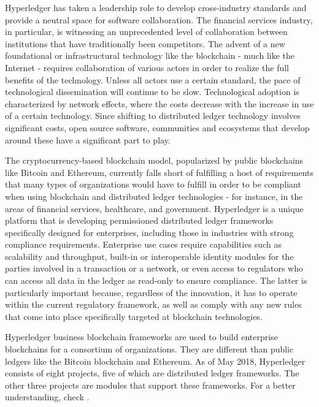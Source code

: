 Hyperledger has taken a leadership role to develop cross-industry standards and provide a neutral space for software collaboration. The financial services industry, in particular, is witnessing an unprecedented level of collaboration between institutions that have traditionally been competitors. The advent of a new foundational or infrastructural technology like the blockchain - much like the Internet - requires collaboration of various actors in order to realize the full benefits of the technology. Unless all actors use a certain standard, the pace of technological dissemination will continue to be slow. Technological adoption is characterized by network effects, where the costs decrease with the increase in use of a certain technology. Since shifting to distributed ledger technology involves significant costs, open source software, communities and ecosystems that develop around these have a significant part to play.

The cryptocurrency-based blockchain model, popularized by public blockchains like Bitcoin and Ethereum, currently falls short of fulfilling a host of requirements that many types of organizations would have to fulfill in order to be compliant when using blockchain and distributed ledger technologies - for instance, in the areas of financial services, healthcare, and government.
Hyperledger is a unique platform that is developing permissioned distributed ledger frameworks specifically designed for enterprises, including those in industries with strong compliance requirements. Enterprise use cases require capabilities such as scalability and throughput, built-in or interoperable identity modules for the parties involved in a transaction or a network, or even access to regulators who can access all data in the ledger as read-only to ensure compliance. The latter is particularly important because, regardless of the innovation, it has to operate within the current regulatory framework, as well as comply with any new rules that come into place specifically targeted at blockchain technologies.

Hyperledger business blockchain frameworks are used to build enterprise blockchains for a consortium of organizations. They are different than public ledgers like the Bitcoin blockchain and Ethereum.
As of May 2018, Hyperledger consists of eight projects, five of which are distributed ledger frameworks. The other three projects are modules that support these frameworks. For a better understanding, check .

